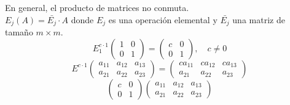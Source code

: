 \documentclass[12pt,a4paper]{book}
\begin{document}
    En general, el producto de matrices no conmuta.\\
    $E_{j}(A)=\bar{E_{j}}\cdot A$ donde $E_{j}$ es una operación elemental y $\bar{E_{j}}$
    una matriz de tamaño $m\times m$.
    \begin{equation*}
        E_{1}^{c\cdot1}
        \begin{pmatrix}
            1 & 0\\
            0 & 1
        \end{pmatrix}
        =
        \begin{pmatrix}
            c & 0\\
            0 & 1
        \end{pmatrix}
        ,\quad c\neq0
    \end{equation*}
    \begin{equation*}
        E^{c\cdot1}
        \begin{pmatrix}
            a_{11} & a_{12} & a_{13}\\
            a_{21} & a_{22} & a_{23}
        \end{pmatrix}
        =
        \begin{pmatrix}
            ca_{11} & ca_{12} & ca_{13}\\
            a_{21} & a_{22} & a_{23}
        \end{pmatrix}
    \end{equation*}
    \begin{equation*}
        \begin{pmatrix}
            c & 0\\
            0 & 1
        \end{pmatrix}
        \begin{pmatrix}
            a_{11} & a_{12} & a_{13}\\
            a_{21} & a_{22} & a_{23}
        \end{pmatrix}
    \end{equation*}
\end{document}
